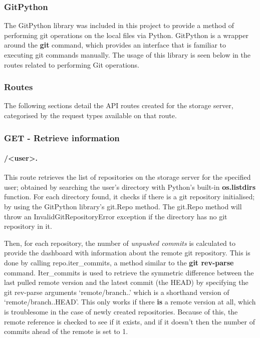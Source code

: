 	\subsubsection{GitPython}
	The GitPython library was included in this project to provide a method of performing git operations on the local files via Python. GitPython is a wrapper around the \textbf{git} command, which provides an interface that is familiar to executing git commands manually. The usage of this library is seen below in the routes related to performing Git operations.

	\subsubsection{Routes}
	The following sections detail the API routes created for the storage server, categorised by the request types available on that route.

	\subsubsection{GET - Retrieve information}
	
	\paragraph{/<user>.}
	This route retrieves the list of repositories on the storage server for the specified user; obtained by searching the user's directory with Python's built-in \textbf{os.listdirs} function. For each directory found, it checks if there is a git repository initialised; by using the GitPython library's git.Repo method. The git.Repo method will throw an InvalidGitRepositoryError exception if the directory has no git repository in it.

	Then, for each repository, the number of \emph{unpushed commits} is calculated to provide the dashboard with information about the remote git repository. This is done by calling repo.iter\_commits, a method similar to the \textbf{git rev-parse} command. Iter\_commits is used to retrieve the symmetric difference between the last pulled remote version and the latest commit (the HEAD) by specifying the git rev-parse arguments `remote/branch..' which is a shorthand version of `remote/branch..HEAD'. This only works if there \textbf{is} a remote version at all, which is troublesome in the case of newly created repositories. Because of this, the remote reference is checked to see if it exists, and if it doesn't then the number of commits ahead of the remote is set to 1.

